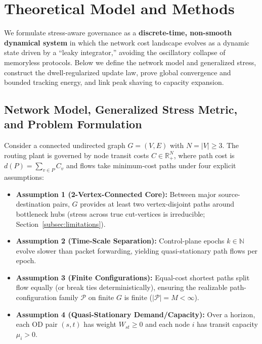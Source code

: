 \documentclass{ccjnl}
\newcommand{\rev}[1]{#1}
\def\rev#1{#1}%
\begin{document}
\section{Theoretical Model and Methods}
\label{sec:model}

We formulate stress-aware governance as a \textbf{discrete-time, non-smooth dynamical system} in which the network cost landscape evolves as a dynamic state driven by a ``leaky integrator,'' avoiding the oscillatory collapse of memoryless protocols. Below we define the network model and generalized stress, construct the dwell-regularized update law, prove global convergence and bounded tracking energy, and link peak shaving to capacity expansion.

\subsection{Network Model, \rev{Generalized Stress Metric, and Problem Formulation}}

Consider a connected undirected graph $G=(V,E)$ with $N=|V| \ge 3$. The routing plant is governed by node transit costs $C \in \mathbb{R}^N_+$, where path cost is $d(P) = \sum_{v \in P} C_v$ and flows take minimum-cost paths under four explicit assumptions:
\rev{\begin{itemize}
    \item \textbf{Assumption 1 (2-Vertex-Connected Core):} Between major source-destination pairs, $G$ provides at least two vertex-disjoint paths around bottleneck hubs (stress across true cut-vertices is irreducible; Section~\ref{subsec:limitations}).
    \item \textbf{Assumption 2 (Time-Scale Separation):} Control-plane epochs $k \in \mathbb{N}$ evolve slower than packet forwarding, yielding quasi-stationary path flows per epoch.
    \item \textbf{Assumption 3 (Finite Configurations):} Equal-cost shortest paths split flow equally (or break ties deterministically), ensuring the realizable path-configuration family $\mathcal{P}$ on finite $G$ is finite ($|\mathcal{P}| = M < \infty$).
    \item \textbf{Assumption 4 (Quasi-Stationary Demand/Capacity):} Over a horizon, each OD pair $(s,t)$ has weight $W_{st} \ge 0$ and each node $i$ has transit capacity $\mu_i > 0$.
\end{itemize}}
\end{document}
